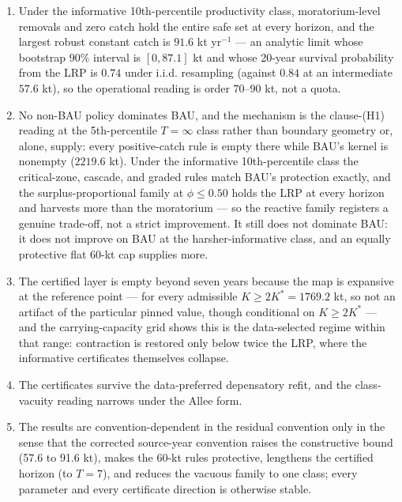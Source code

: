 \documentclass[11pt]{article}
\begin{document}
\begin{enumerate}
\def\labelenumi{(\arabic{enumi})}
\item
  Under the informative 10th-percentile productivity class,
  moratorium-level removals and zero catch hold the entire safe set at
  every horizon, and the largest robust constant catch is \(91.6\) kt
  yr\(^{-1}\) --- an analytic limit whose bootstrap \(90\%\) interval is
  \([0, 87.1]\) kt and whose 20-year survival probability from the LRP
  is \(0.74\) under i.i.d. resampling (against \(0.84\) at an
  intermediate \(57.6\) kt), so the operational reading is order
  \(70\)--\(90\) kt, not a quota.
\item
  No non-BAU policy dominates BAU, and the mechanism is the clause-(H1)
  reading at the 5th-percentile \(T=\infty\) class rather than boundary
  geometry or, alone, supply: every positive-catch rule is empty there
  while BAU's kernel is nonempty (\(2219.6\) kt). Under the informative
  10th-percentile class the critical-zone, cascade, and graded rules
  match BAU's protection exactly, and the surplus-proportional family at
  \(\phi \le 0.50\) holds the LRP at every horizon and harvests more
  than the moratorium --- so the reactive family registers a genuine
  trade-off, not a strict improvement. It still does not dominate BAU:
  it does not improve on BAU at the harsher-informative class, and an
  equally protective flat 60-kt cap supplies more.
\item
  The certified layer is empty beyond seven years because the map is
  expansive at the reference point --- for every admissible
  \(K \ge 2K^* = 1769.2\) kt, so not an artifact of the particular
  pinned value, though conditional on \(K \ge 2K^*\) --- and the
  carrying-capacity grid shows this is the data-selected regime within
  that range: contraction is restored only below twice the LRP, where
  the informative certificates themselves collapse.
\item
  The certificates survive the data-preferred depensatory refit, and the
  class-vacuity reading narrows under the Allee form.
\item
  The results are convention-dependent in the residual convention only
  in the sense that the corrected source-year convention raises the
  constructive bound (57.6 to 91.6 kt), makes the 60-kt rules
  protective, lengthens the certified horizon (to \(T=7\)), and reduces
  the vacuous family to one class; every parameter and every certificate
  direction is otherwise stable.
\end{enumerate}
\end{document}
